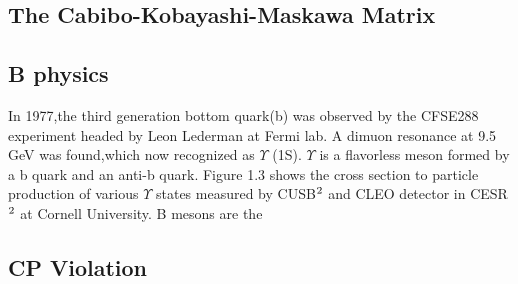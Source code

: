 \subsection{The Cabibo-Kobayashi-Maskawa Matrix}


\subsection{B physics}
In 1977,the third generation bottom quark(b) was observed by the CFS\footnotemark[1]
E288 experiment headed by Leon Lederman at Fermi lab. 
A dimuon resonance at 9.5 GeV was found,which now recognized as $\Upsilon$ (1S).
$\Upsilon$ is a flavorless meson formed by a b quark and an anti-b quark. Figure 1.3 shows
the cross section to particle production of various $\Upsilon$ states measured by CUSB$\footnotemark[2]$
and CLEO detector in CESR$\footnotemark[2]$ at Cornell University.
B mesons are the
\subsection{CP Violation}

%
%
